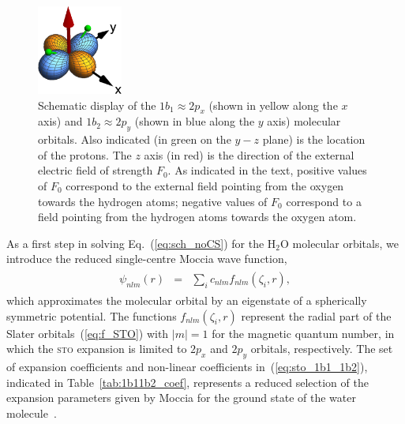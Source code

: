 \begin{figure}
  \centering
  \includegraphics[width=0.25\textwidth]{figures/ch_H2O/1b1_1b2/orbitals.eps}
  \caption{Schematic display of the $1b_{1}\approx 2p_{x}$ (shown in
    yellow along the $x$ axis) and $1b_{2}\approx 2p_{y}$ (shown in
    blue along the $y$ axis) molecular orbitals. Also indicated (in
    green on the $y-z$ plane) is the location of the protons. The $z$
    axis (in red) is the direction of the external electric field of
    strength $F_{0}$. As indicated in the text, positive values of
    $F_{0}$ correspond to the external field pointing from the oxygen
    towards the hydrogen atoms; negative values of $F_{0}$ correspond
    to a field pointing from the hydrogen atoms towards the oxygen
    atom.}
  \label{fig:h2o_1b1_1b2}
\end{figure}

As a first step in solving Eq.~(\ref{eq:sch_noCS}) for the H$_{2}$O
molecular orbitals, we introduce the reduced single-centre Moccia
wave function,
%
\begin{eqnarray}
  \begin{split}
    \psi_{nlm}(r) & = & \sum\limits_{i}
    c_{nlm} f_{nlm}(\zeta_{i}, r),
    \label{eq:sto_1b1_1b2}
  \end{split}
\end{eqnarray}
%
which approximates the molecular orbital by an eigenstate of a
spherically symmetric potential. The functions $f_{nlm}(\zeta_{i},r)$
represent the radial part of the Slater orbitals~(\ref{eq:f_STO}) with
$|m|=1$ for the magnetic quantum number, in which the \textsc{sto}
expansion is limited to $2p_{x}$ and $2p_{y}$ orbitals,
respectively. The set of expansion coefficients and non-linear
coefficients in~(\ref{eq:sto_1b1_1b2}), indicated in
Table~\ref{tab:1b11b2_coef}, represents a reduced selection of the
expansion parameters given by Moccia for the ground state of the water
molecule~\cite{Moccia_1964}.

